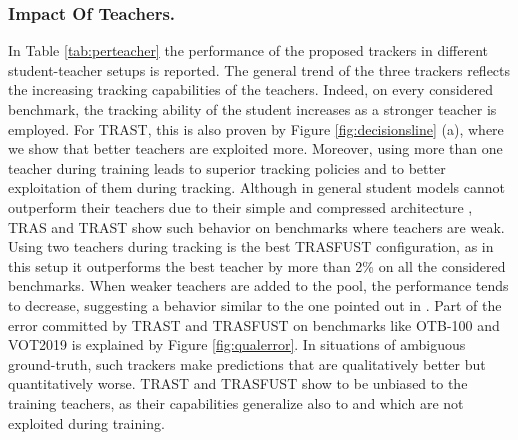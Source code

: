 \documentclass[runningheads]{llncs}
\makeatletter
\def\myalgonamefirst{TRAS\@\xspace}
\def\myalgonamesecond{TRAST\@\xspace}
\def\myalgonamethird{TRASFUST\@\xspace}
\makeatother
\begin{document}
\subsubsection{Impact Of Teachers.}
In Table \ref{tab:perteacher} the performance of the proposed trackers in different student-teacher setups is reported.
The general trend of the three trackers reflects the increasing tracking capabilities of the teachers. Indeed, on every considered benchmark, the tracking ability of the student increases as a stronger teacher is employed.
For \myalgonamesecond, this is also proven by Figure \ref{fig:decisionsline} (a), where we show that better teachers are exploited more.
Moreover, using more than one teacher during training leads to superior tracking policies and to  better exploitation of them during tracking.
Although in general student models cannot outperform their teachers due to their simple and compressed architecture \cite{Cho2019}, \myalgonamefirst and \myalgonamesecond show such behavior on benchmarks where teachers are weak. 
Using two teachers during tracking is the best \myalgonamethird configuration, as in this setup it outperforms the best teacher by more than 2\% on all the considered benchmarks. 
When weaker teachers are added to the pool, the performance tends to decrease, suggesting a behavior similar to the one pointed out in \cite{Bailer2014}.
Part of the error committed by \myalgonamesecond and \myalgonamethird on benchmarks like OTB-100 and VOT2019 is explained by Figure \ref{fig:qualerror}. In situations of ambiguous ground-truth, such trackers make predictions that are qualitatively better but quantitatively worse.
\myalgonamesecond and \myalgonamethird show to be unbiased to the training teachers, as their capabilities generalize also to  and  which are not exploited during training.
\end{document}
